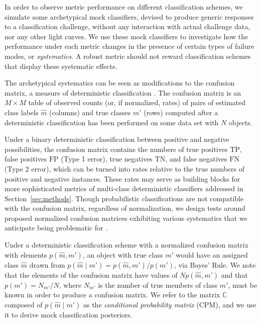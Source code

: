 In order to observe metric performance on different classification schemes, we simulate some archetypical mock classifiers, devised to produce generic responses to a classification challenge, without any interaction with actual challenge data, nor any other light curves.
We use these mock classifiers to investigate how the performance under each metric changes in the presence of certain types of failure modes, or \textit{systematics}.
A robust metric should not reward classification schemes that display these systematic effects.

The archetypical systematics can be seen as modifications to the confusion matrix, a measure of deterministic classification \citep{bloom_automating_2012}.
The confusion matrix is an $M \times M$ table of observed counts (or, if normalized, rates) of pairs of estimated class labels $\hat{m}$ (columns) and true classes $m'$ (rows) computed after a deterministic classification has been performed on some data set with $N$ objects.

Under a binary deterministic classification between positive and negative possibilities, the confusion matrix contains the numbers of true positives $\mathrm{TP}$, false positives $\mathrm{FP}$ (Type 1 error), true negatives $\mathrm{TN}$, and false negatives $\mathrm{FN}$ (Type 2 error), which can be turned into rates relative to the true numbers of positive and negative instances.
These rates may serve as building blocks for more sophisticated metrics of multi-class deterministic classifiers addressed in Section~\ref{sec:methods}.
Though probabilistic classifications are not compatible with the confusion matrix, regardless of normalization, we design tests around proposed normalized confusion matrices exhibiting various systematics that we anticipate being problematic for \lsst.

Under a deterministic classification scheme with a normalized confusion matrix with elements $p(\hat{m}, m')$, an object with true class $m'$ would have an assigned class $\hat{m}$ drawn from $p(\hat{m} \mid m') = p(\hat{m}, m') / p(m')$, via Bayes' Rule.
We note that the elements of the confusion matrix have values of $N p(\hat{m}, m')$ and that $p(m') = N_{m'} / N$, where $N_{m'}$ is the number of true members of class $m'$, must be known in order to produce a confusion matrix.
We refer to the matrix $\mathbb{C}$ composed of $p(\hat{m} \mid m')$ as the \textit{conditional probability matrix} (CPM), and we use it to derive mock classification posteriors.

